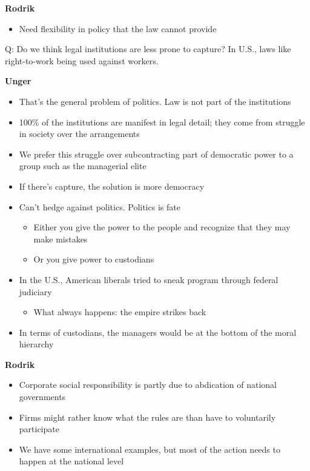 \textbf{Rodrik}

\begin{itemize}
\tightlist
\item
  Need flexibility in policy that the law cannot provide
\end{itemize}

Q: Do we think legal institutions are less prone to capture? In U.S.,
laws like right-to-work being used against workers.

\textbf{Unger}

\begin{itemize}
\tightlist
\item
  That's the general problem of politics. Law is not part of the
  institutions
\item
  100\% of the institutions are manifest in legal detail; they come from
  struggle in society over the arrangements
\item
  We prefer this struggle over subcontracting part of democratic power
  to a group such as the managerial elite
\item
  If there's capture, the solution is more democracy
\item
  Can't hedge against politics. Politics is fate

  \begin{itemize}
  \tightlist
  \item
    Either you give the power to the people and recognize that they may
    make mistakes
  \item
    Or you give power to custodians
  \end{itemize}
\item
  In the U.S., American liberals tried to sneak program through federal
  judiciary

  \begin{itemize}
  \tightlist
  \item
    What always happens: the empire strikes back
  \end{itemize}
\item
  In terms of custodians, the managers would be at the bottom of the
  moral hierarchy
\end{itemize}

\textbf{Rodrik}

\begin{itemize}
\tightlist
\item
  Corporate social responsibility is partly due to abdication of
  national governments
\item
  Firms might rather know what the rules are than have to voluntarily
  participate
\item
  We have some international examples, but most of the action needs to
  happen at the national level
\end{itemize}

